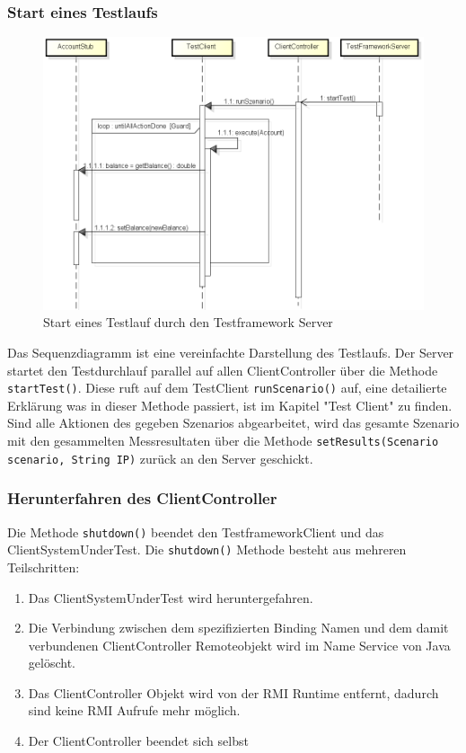 \subsubsection{Start eines Testlaufs}
\begin{figure}[H]
\begin{center}
\includegraphics[scale=0.4]{image_testFramework/startTest.png}
\end{center}
\caption{Start eines Testlauf durch den Testframework Server}
\end{figure}
Das Sequenzdiagramm ist eine vereinfachte Darstellung des Testlaufs. Der Server startet den Testdurchlauf parallel auf allen ClientController über die Methode \verb+startTest()+. Diese ruft auf dem TestClient \verb+runScenario()+ auf, eine detailierte Erklärung was in dieser Methode passiert, ist im Kapitel "Test Client" zu finden. Sind alle Aktionen des gegeben Szenarios abgearbeitet, wird das gesamte Szenario mit den gesammelten Messresultaten über die Methode \verb+setResults(Scenario scenario, String IP)+ zurück an den Server geschickt.

\subsubsection{Herunterfahren des ClientController}
Die Methode \texttt{shutdown()} be\-endet den Test\-frame\-work\-Client und das Client\-System\-Under\-Test. Die \texttt{shut\allowbreak down()} Me\-tho\-de be\-steht aus mehreren Teil\-schrit\-ten:
\begin{enumerate}
\item Das ClientSystemUnderTest wird heruntergefahren.
\item Die Verbindung zwischen dem spezifizierten Binding Namen und dem damit verbundenen ClientController Remoteobjekt wird im Name Service von Java gelöscht.
\item Das ClientController Objekt wird von der RMI Run\-time entfernt, da\-durch sind keine RMI Aufrufe mehr möglich.
\item Der ClientController beendet sich selbst
\end{enumerate}


